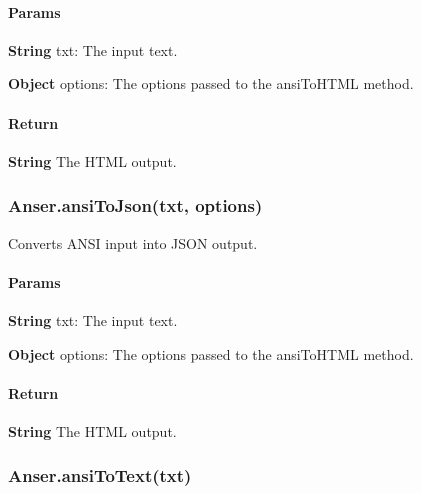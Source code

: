 \paragraph*{Params}


\begin{DoxyItemize}
\item {\bfseries String} {\ttfamily txt}\+: The input text.
\item {\bfseries Object} {\ttfamily options}\+: The options passed to the ansi\+To\+H\+T\+ML method.
\end{DoxyItemize}

\paragraph*{Return}


\begin{DoxyItemize}
\item {\bfseries String} The H\+T\+ML output.
\end{DoxyItemize}

\subsubsection*{{\ttfamily Anser.\+ansi\+To\+Json(txt, options)}}

Converts A\+N\+SI input into J\+S\+ON output.

\paragraph*{Params}


\begin{DoxyItemize}
\item {\bfseries String} {\ttfamily txt}\+: The input text.
\item {\bfseries Object} {\ttfamily options}\+: The options passed to the ansi\+To\+H\+T\+ML method.
\end{DoxyItemize}

\paragraph*{Return}


\begin{DoxyItemize}
\item {\bfseries String} The H\+T\+ML output.
\end{DoxyItemize}

\subsubsection*{{\ttfamily Anser.\+ansi\+To\+Text(txt)}}

